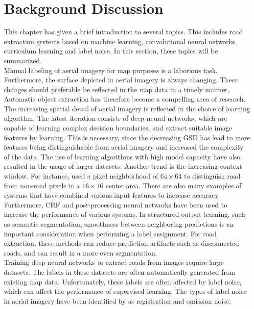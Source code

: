 \section{Background Discussion}
\label{sec:backgroundDiscussion}
This chapter has given a brief introduction to several topics. This includes road extraction systems based on machine learning, convolutional neural networks, curriculum learning and label noise. In this section, these topics will be summarized. \\

Manual labeling of aerial imagery for map purposes is a laborious task. Furthermore, the surface depicted in aerial imagery is always changing. These changes should preferable be reflected in the map data in a timely manner. Automatic object extraction has therefore become a compelling area of research.\\

The increasing spatial detail of aerial imagery is reflected in the choice of learning algorithm. The latest iteration consists of deep neural networks, which are capable of learning complex decision boundaries, and extract suitable image features by learning. This is necessary, since the decreasing \ac{GSD} has lead to more features being distinguishable from aerial imagery and increased the complexity of the data. The use of learning algorithms with high model capacity have also resulted in the usage of larger datasets. Another trend is the increasing context window. For instance, \cite{Mnih_roads_high_res_aerial_images} used a pixel neighborhood of $64 \times 64$ to distinguish road from non-road pixels in a $16 \times 16$ center area. There are also many examples of systems that have combined various input features to increase accuracy.\\

Furthermore, \ac{CRF} and post-processing neural networks have been used to increase the performance of various systems. In structured output learning, such as semantic segmentation, smoothness between neighboring predictions is an important consideration when performing a label assignment. For road extraction, these methods can reduce prediction artifacts such as disconnected roads, and can result in a more even segmentation.\\

Training deep neural networks to extract roads from images require large datasets. The labels in these datasets are often automatically generated from existing map data. Unfortunately, these labels are often affected by label noise, which can affect the performance of supervised learning. The types of label noise in aerial imagery have been identified by \cite{Mnih_aerial_images_noisy} as registration and omission noise.  \\


